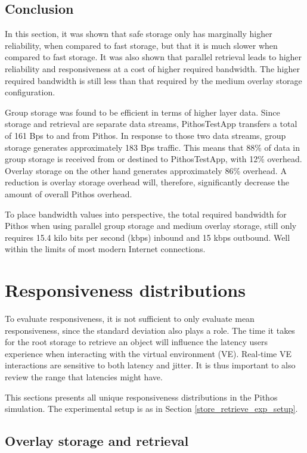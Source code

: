\subsection{Conclusion}

In this section, it was shown that safe storage only has marginally higher reliability, when compared to fast storage, but that it is much slower when compared to fast storage. It was also shown that parallel retrieval leads to higher reliability and responsiveness at a cost of higher required bandwidth. The higher required bandwidth is still less than that required by the medium overlay storage configuration.

Group storage was found to be efficient in terms of higher layer data. Since storage and retrieval are separate data streams, PithosTestApp transfers a total of 161 Bps to and from Pithos. In response to those two data streams, group storage generates approximately 183 Bps traffic. This means that 88\% of data in group storage is received from or destined to PithosTestApp, with 12\% overhead. Overlay storage on the other hand generates approximately 86\% overhead. A reduction is overlay storage overhead will, therefore, significantly decrease the amount of overall Pithos overhead.

To place bandwidth values into perspective, the total required bandwidth for Pithos when using parallel group storage and medium overlay storage, still only requires 15.4 kilo bits per second (kbps) inbound and 15 kbps outbound. Well within the limits of most modern Internet connections.

\section{Responsiveness distributions}

To evaluate responsiveness, it is not sufficient to only evaluate mean responsiveness, since the standard deviation also plays a role. The time it takes for the root storage to retrieve an object will influence the latency users experience when interacting with the virtual environment (VE). Real-time VE interactions are sensitive to both latency and jitter. It is thus important to also review the range that latencies might have.

This sections presents all unique responsiveness distributions in the Pithos simulation. The experimental setup is as in Section \ref{store_retrieve_exp_setup}.

\subsection{Overlay storage and retrieval}

